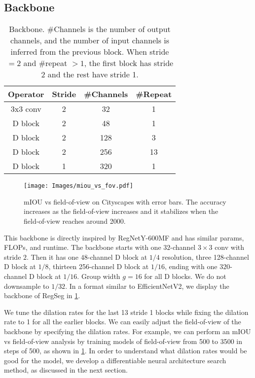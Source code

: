 \documentclass[10pt,twocolumn,letterpaper]{article}
\begin{document}
\subsection{Backbone}
\label{sec:backbone}
\begin{table}
  \centering
  \begin{tabular}{c|c|c|c}
    \toprule
    Operator & Stride & \#Channels & \#Repeat \\
    \midrule
    3x3 conv & 2 & 32 & 1\\
    D block & 2 & 48 & 1\\
    D block & 2 & 128 & 3\\
    D block & 2 & 256 & 13\\
    D block & 1 & 320 & 1\\
    \bottomrule
  \end{tabular}
  \caption{Backbone. \#Channels is the number of output channels, and the number of input channels is inferred from the previous block. When stride $=2$ and \#repeat $>1$, the first block has stride 2 and the rest have stride 1.}
  \label{tab:backbone}
\end{table}
\begin{figure}
  \centering
    \texttt{[image: Images/miou\_vs\_fov.pdf]}

   \caption{mIOU vs field-of-view on Cityscapes with error bars. The accuracy increases as the field-of-view increases and it stabilizes when the field-of-view reaches around 2000.}
   \label{fig:miou_vs_fov}
\end{figure}
This backbone is directly inspired by RegNetY-600MF\cite{regnet} and has similar params, FLOPs, and runtime. The backbone starts with one $32$-channel $3\times 3$ conv with stride $2$. Then it has one $48$-channel D block at $1/4$ resolution, three 128-channel D block at $1/8$, thirteen 256-channel D block at $1/16$, ending with one $320$-channel D block at $1/16$. Group width $g=16$ for all D blocks. We do not downsample to $1/32$. In a format similar to EfficientNetV2\cite{efficientnetv2}, we display the backbone of RegSeg in \cref{tab:backbone}.

We tune the dilation rates for the last 13 stride 1 blocks while fixing the dilation rate to 1 for all the earlier blocks. We can easily adjust the field-of-view of the backbone by specifying the dilation rates. For example, we can perform an mIOU vs field-of-view analysis by training models of field-of-view from 500 to 3500 in steps of 500, as shown in \cref{fig:miou_vs_fov}. In order to understand what dilation rates would be good for the model, we develop a differentiable neural architecture search method, as discussed in the next section. 
\end{document}
